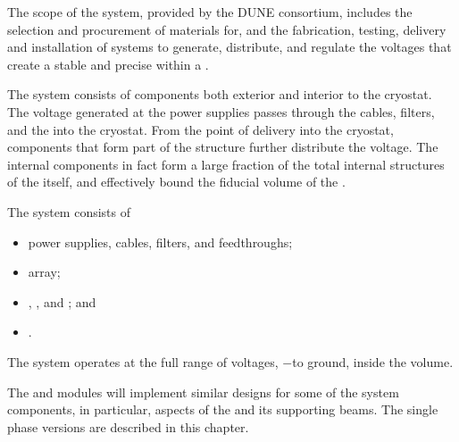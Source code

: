 
The scope of the \single {} system, provided by the DUNE  consortium, includes the selection and procurement of materials for, and the fabrication, testing, delivery and installation of systems to generate, distribute, and regulate the voltages that
create a stable and precise \efield{} within a . 

The  system consists of components both exterior and interior to the cryostat. The voltage generated at the  power supplies passes through the cables, filters, and the  \fdth into the cryostat. From the point of delivery into the cryostat, components that form part of the  structure further distribute the voltage. The internal  components in fact form a large fraction of the total internal structures of the  itself, and  
 effectively bound the  fiducial volume of the %
 . %

The  system consists of
\begin{itemize}
\item {} power supplies, cables, filters, and feedthroughs;
\item {} array;
\item {}, , and ; and
\item {}.
\end{itemize}


The system operates at the full range of voltages, %
$-$\sptargetdriftvoltpos to ground, inside the  volume. 

The \single and \dual modules will implement similar designs for some
 of the  system components, %
 in particular, aspects of the  and its supporting beams. The single phase versions are described in this chapter. 
 
